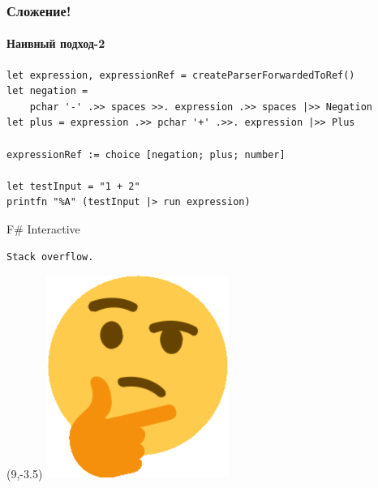 \documentclass[xetex,mathserif,serif]{beamer}
\begin{document}
    \begin{frame}[fragile]
        \frametitle{Сложение!}
        \framesubtitle{Наивный подход-2}
        \begin{verbatim}
let expression, expressionRef = createParserForwardedToRef()
let negation = 
    pchar '-' .>> spaces >>. expression .>> spaces |>> Negation
let plus = expression .>> pchar '+' .>>. expression |>> Plus

expressionRef := choice [negation; plus; number]

let testInput = "1 + 2"
printfn "%A" (testInput |> run expression)
        \end{verbatim}

        \begin{exampleblock}{F\# Interactive}
            \begin{verbatim}
Stack overflow.
            \end{verbatim}
        \end{exampleblock}
        \begin{textblock}{2}(9,-3.5)
            \includegraphics[width=\textwidth]{hmm.png}
        \end{textblock}
    \end{frame}
\end{document}
